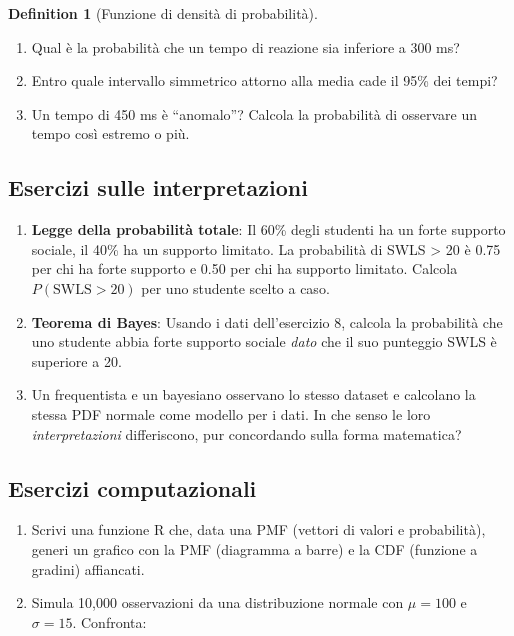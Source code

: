 \documentclass[
  letterpaper,
  DIV=11,
  numbers=noendperiod,
  oneside]{scrreprt}
\providecommand{\tightlist}{%
  \setlength{\itemsep}{0pt}\setlength{\parskip}{0pt}}
\theoremstyle{definition}
\theoremstyle{plain}
\theoremstyle{definition}
\newtheorem{definition}{Definition}[chapter]
\theoremstyle{remark}
\begin{document}
\begin{definition}[Funzione di densità di
probabilità]
\begin{tcolorbox}
\begin{enumerate}
  \begin{enumerate}
  \def\labelenumii{\alph{enumii}.}
  \tightlist
  \item
    Qual è la probabilità che un tempo di reazione sia inferiore a 300
    ms?
  \item
    Entro quale intervallo simmetrico attorno alla media cade il 95\%
    dei tempi?
  \item
    Un tempo di 450 ms è ``anomalo''? Calcola la probabilità di
    osservare un tempo così estremo o più.
  \end{enumerate}
\end{enumerate}

\subsection*{Esercizi sulle
interpretazioni}\label{esercizi-sulle-interpretazioni}

\begin{enumerate}
\def\labelenumi{\arabic{enumi}.}
\setcounter{enumi}{7}
\item
  \textbf{Legge della probabilità totale}: Il 60\% degli studenti ha un
  forte supporto sociale, il 40\% ha un supporto limitato. La
  probabilità di SWLS \textgreater{} 20 è 0.75 per chi ha forte supporto
  e 0.50 per chi ha supporto limitato. Calcola \(P(\text{SWLS} > 20)\)
  per uno studente scelto a caso.
\item
  \textbf{Teorema di Bayes}: Usando i dati dell'esercizio 8, calcola la
  probabilità che uno studente abbia forte supporto sociale \emph{dato}
  che il suo punteggio SWLS è superiore a 20.
\item
  Un frequentista e un bayesiano osservano lo stesso dataset e calcolano
  la stessa PDF normale come modello per i dati. In che senso le loro
  \emph{interpretazioni} differiscono, pur concordando sulla forma
  matematica?
\end{enumerate}

\subsection*{Esercizi computazionali}\label{esercizi-computazionali-2}

\begin{enumerate}
\def\labelenumi{\arabic{enumi}.}
\setcounter{enumi}{10}
\item
  Scrivi una funzione R che, data una PMF (vettori di valori e
  probabilità), generi un grafico con la PMF (diagramma a barre) e la
  CDF (funzione a gradini) affiancati.
\item
  Simula 10,000 osservazioni da una distribuzione normale con
  \(\mu = 100\) e \(\sigma = 15\). Confronta:


\end{enumerate}
\end{tcolorbox}
\end{definition}
\end{document}
